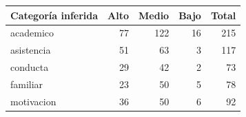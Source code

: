 \begin{tabular}{lrrrr}
\toprule
Categoría inferida & Alto & Medio & Bajo & Total \\
\midrule
academico & 77 & 122 & 16 & 215 \\
asistencia & 51 & 63 & 3 & 117 \\
conducta & 29 & 42 & 2 & 73 \\
familiar & 23 & 50 & 5 & 78 \\
motivacion & 36 & 50 & 6 & 92 \\
\bottomrule
\end{tabular}
